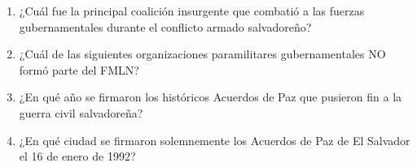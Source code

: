 \documentclass[10pt,a4paper]{article}
\begin{document}
\begin{enumerate}[label=\textbf{\arabic*.}]
\begin{enumerate}[label=\textbf{\Alph*)}]
\end{enumerate}
\vspace{0.15cm}
\item ¿Cuál fue la principal coalición insurgente que combatió a las fuerzas gubernamentales durante el conflicto armado salvadoreño?
\begin{enumerate}[label=\textbf{\Alph*)}]
\end{enumerate}
\vspace{0.15cm}
\item ¿Cuál de las siguientes organizaciones paramilitares gubernamentales NO formó parte del FMLN?
\begin{enumerate}[label=\textbf{\Alph*)}]
\end{enumerate}
\vspace{0.15cm}
\item ¿En qué año se firmaron los históricos Acuerdos de Paz que pusieron fin a la guerra civil salvadoreña?
\begin{enumerate}[label=\textbf{\Alph*)}]
\end{enumerate}
\vspace{0.15cm}
\item ¿En qué ciudad se firmaron solemnemente los Acuerdos de Paz de El Salvador el 16 de enero de 1992?
\begin{enumerate}[label=\textbf{\Alph*)}]

\end{enumerate}
\end{enumerate}
\end{document}
